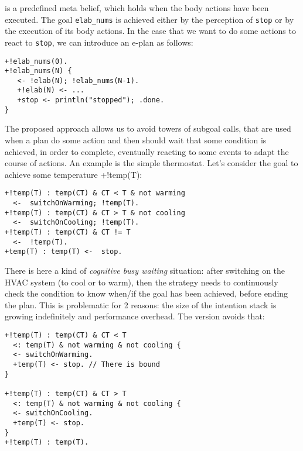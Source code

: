  is a predefined meta belief, which holds when the body actions have been executed. The goal \texttt{elab\_nums} is achieved either by the perception of \texttt{stop} or by the execution of its body actions.
%
In the case that we want to do some actions to react to \texttt{stop}, we can introduce an e-plan as follows:

{\small
\begin{verbatim}
+!elab_nums(0).
+!elab_nums(N) {
   <- !elab(N); !elab_nums(N-1).
   +!elab(N) <- ...
   +stop <- println("stopped"); .done.
}
\end{verbatim}}

\bigskip 
The proposed approach allows us to avoid towers of subgoal calls, that are used when a plan do some action and then should wait that some condition is achieved, in order to complete, eventually reacting to some events to adapt the course of actions. 
%
An example is the simple thermostat. 
%
Let's consider the goal to achieve some temperature +!temp(T):

{\small
\begin{verbatim}
+!temp(T) : temp(CT) & CT < T & not warming
  <-  switchOnWarming; !temp(T).
+!temp(T) : temp(CT) & CT > T & not cooling
  <-  switchOnCooling; !temp(T).
+!temp(T) : temp(CT) & CT != T 
  <-  !temp(T).
+temp(T) : temp(T) <-  stop.
\end{verbatim}}

\noindent There is here a kind of \emph{cognitive busy waiting} situation: after switching on the HVAC system (to cool or to warm), then the strategy needs to continuously check the condition to know when/if the goal has been achieved, before ending the plan.
%
This is problematic for 2 reasons: the size of the intention stack is growing indefinitely and 
performance overhead. 
%
The \aser version avoids that:

{\small
\begin{verbatim}
+!temp(T) : temp(CT) & CT < T 
  <: temp(T) & not warming & not cooling {  
  <- switchOnWarming.
  +temp(T) <- stop. // There is bound
}

+!temp(T) : temp(CT) & CT > T 
  <: temp(T) & not warming & not cooling {  
  <- switchOnCooling.	
  +temp(T) <- stop.		
}
+!temp(T) : temp(T).
\end{verbatim}}


